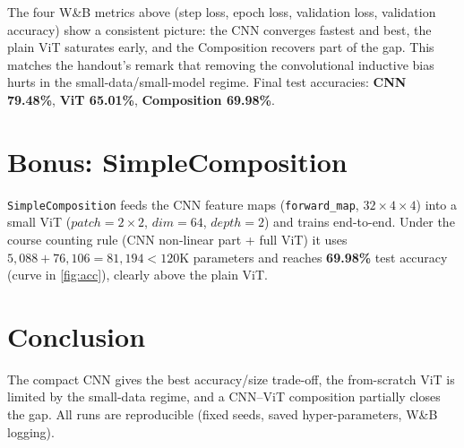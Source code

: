 \documentclass{article}
\begin{document}
The four W\&B metrics above (step loss, epoch loss, validation loss, validation accuracy) show a consistent picture: the CNN converges fastest and best, the plain ViT saturates early, and the Composition recovers part of the gap. This matches the handout's remark that removing the convolutional inductive bias hurts in the small-data/small-model regime. Final test accuracies: \textbf{CNN 79.48\%}, \textbf{ViT 65.01\%}, \textbf{Composition 69.98\%}.

\section{Bonus: SimpleComposition}
\texttt{SimpleComposition} feeds the CNN feature maps (\texttt{forward\_map}, $32\times4\times4$) into a small ViT ($patch=2\times2$, $dim=64$, $depth=2$) and trains end-to-end. Under the course counting rule (CNN non-linear part + full ViT) it uses $5{,}088+76{,}106=81{,}194<120$K parameters and reaches \textbf{69.98\%} test accuracy (curve in \cref{fig:acc}), clearly above the plain ViT.

\section{Conclusion}
The compact CNN gives the best accuracy/size trade-off, the from-scratch ViT is limited by the small-data regime, and a CNN--ViT composition partially closes the gap. All runs are reproducible (fixed seeds, saved hyper-parameters, W\&B logging).



\end{document}

